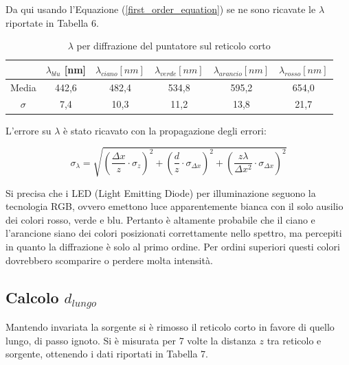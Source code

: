 \documentclass{article}
\begin{document}
\pagebreak 
Da qui usando l'Equazione (\ref{first_order_equation}) se ne sono ricavate le $\lambda$ riportate in Tabella 6.

\begin{table}[h]
    \centering
\begin{tabular}{||c|c|c|c|c|c||}
    \hline
     & \cellcolor{blue}$\lambda_{blu}$ [nm] & \cellcolor{cyan}$\lambda_{ciano} [nm]$ & \cellcolor{green}$\lambda_{verde}[nm]$ & \cellcolor{orange}$\lambda_{arancio}[nm]$ & \cellcolor{red}$\lambda_{rosso}[nm]$ \\
    \hline
    Media & 442,6 & 482,4 & 534,8 & 595,2 & 654,0 \\
    $\sigma$ & 7,4 & 10,3 & 11,2 & 13,8 & 21,7\\
    \hline
\end{tabular}
\caption{$\lambda$ per diffrazione del puntatore sul reticolo corto}
\end{table}

L'errore su $\lambda$ è stato ricavato con la propagazione degli errori:

\begin{equation}
        \sigma_\lambda =  \sqrt{\left(\frac{\Delta x}{z}\cdot\sigma_z\right)^2 + \left(\frac{d}{z}\cdot\sigma_{\Delta x}\right)^2 + \left(\frac{z \lambda}{\Delta x^2}\cdot\sigma_{\Delta x}\right)^2}
    \label{lambda_error}
\end{equation}

\vspace{3mm}

Si precisa che i LED (Light Emitting Diode) per illuminazione seguono la tecnologia RGB, ovvero emettono luce apparentemente bianca con il solo ausilio dei colori rosso, verde e blu. Pertanto è altamente probabile che il ciano e l'arancione siano dei colori posizionati correttamente nello spettro, ma percepiti in quanto la diffrazione è solo al primo ordine. Per ordini superiori questi colori dovrebbero scomparire o perdere molta intensità.



\subsection{Calcolo \textrm{$d_{lungo}$}}

Mantendo invariata la sorgente si è rimosso il reticolo corto in favore di quello lungo, di passo ignoto. Si è misurata per 7 volte la distanza $z$ tra reticolo e sorgente, ottenendo i dati riportati in Tabella 7.
\end{document}
